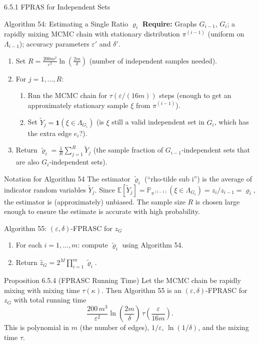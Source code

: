 \documentclass[aspectratio=169,10pt]{beamer}
\newcommand{\PP}{\mathbb{P}}
\newcommand{\EE}{\mathbb{E}}
\begin{document}
\begin{frame}[allowframebreaks]{6.5.1 FPRAS for Independent Sets}
\begin{block}{Algorithm 54: Estimating a Single Ratio $\varrho_i$}
\textbf{Require:} Graphs $G_{i-1}$, $G_i$; a rapidly mixing MCMC chain with stationary distribution $\pi^{(i-1)}$ (uniform on $\Lambda_{i-1}$); accuracy parameters $\varepsilon'$ and $\delta'$.
\begin{enumerate}
  \item Set $R = \frac{200m^2}{\varepsilon^2}\ln\!\left(\frac{2m}{\delta}\right)$ (number of independent samples needed).
  \item For $j = 1, \ldots, R$:
    \begin{enumerate}
      \item Run the MCMC chain for $\tau(\varepsilon/(16m))$ steps (enough to get an approximately stationary sample $\xi$ from $\pi^{(i-1)}$).
      \item Set $\tilde{Y}_j = \mathbf{1}(\xi \in \Lambda_{G_i})$ (is $\xi$ still a valid independent set in $G_i$, which has the extra edge $e_i$?).
    \end{enumerate}
  \item Return $\tilde\varrho_i = \frac{1}{R}\sum_{j=1}^R \tilde{Y}_j$ (the sample fraction of $G_{i-1}$-independent sets that are also $G_i$-independent sets).
\end{enumerate}
\end{block}

\begin{block}{Notation for Algorithm 54}
The estimator $\tilde\varrho_i$ (``rho-tilde sub i'') is the average of indicator random variables $\tilde{Y}_j$.
Since $\EE[\tilde{Y}_j] = \PP_{\pi^{(i-1)}}(\xi \in \Lambda_{G_i}) = z_i/z_{i-1} = \varrho_i$, the estimator is (approximately) unbiased.
The sample size $R$ is chosen large enough to ensure the estimate is accurate with high probability.
\end{block}

\begin{block}{Algorithm 55: $(\varepsilon, \delta)$-FPRASC for $z_G$}
\begin{enumerate}
  \item For each $i = 1, \ldots, m$: compute $\tilde\varrho_i$ using Algorithm 54.
  \item Return $\hat{z}_G = 2^M \prod_{i=1}^m \tilde\varrho_i$.
\end{enumerate}
\end{block}

\framebreak

\begin{block}{Proposition 6.5.4 (FPRASC Running Time)}
Let the MCMC chain be rapidly mixing with mixing time $\tau(\kappa)$.
Then Algorithm 55 is an $(\varepsilon, \delta)$-FPRASC for $z_G$ with total running time
\[
  \frac{200\,m^3}{\varepsilon^2}\ln\!\left(\frac{2m}{\delta}\right)\,\tau\!\left(\frac{\varepsilon}{16m}\right).
\]
This is polynomial in $m$ (the number of edges), $1/\varepsilon$, $\ln(1/\delta)$, and the mixing time $\tau$.
\end{block}


\end{frame}
\end{document}
